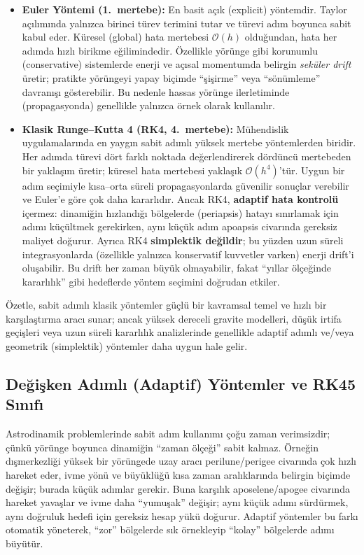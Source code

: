 \begin{itemize}
    \item \textbf{Euler Yöntemi (1.\ mertebe):}
    En basit açık (explicit) yöntemdir. Taylor açılımında yalnızca birinci türev terimini tutar ve türevi adım boyunca sabit kabul eder.
    Küresel (global) hata mertebesi $\mathcal{O}(h)$ olduğundan, hata her adımda hızlı birikme eğilimindedir.
    Özellikle yörünge gibi korunumlu (conservative) sistemlerde enerji ve açısal momentumda belirgin \emph{seküler drift} üretir;
    pratikte yörüngeyi yapay biçimde “şişirme” veya “sönümleme” davranışı gösterebilir. Bu nedenle hassas yörünge ilerletiminde
    (propagasyonda) genellikle yalnızca örnek olarak kullanılır.

    \item \textbf{Klasik Runge--Kutta 4 (RK4, 4.\ mertebe):}
    Mühendislik uygulamalarında en yaygın sabit adımlı yüksek mertebe yöntemlerden biridir. Her adımda türevi dört farklı noktada
    değerlendirerek dördüncü mertebeden bir yaklaşım üretir; küresel hata mertebesi yaklaşık $\mathcal{O}(h^{4})$’tür.
    Uygun bir adım seçimiyle kısa--orta süreli propagasyonlarda güvenilir sonuçlar verebilir ve Euler’e göre çok daha kararlıdır.
    Ancak RK4, \textbf{adaptif hata kontrolü} içermez: dinamiğin hızlandığı bölgelerde (periapsis) hatayı sınırlamak için
    adımı küçültmek gerekirken, aynı küçük adım apoapsis civarında gereksiz maliyet doğurur.
    Ayrıca RK4 \textbf{simplektik değildir}; bu yüzden uzun süreli integrasyonlarda (özellikle yalnızca konservatif kuvvetler varken)
    enerji drift’i oluşabilir. Bu drift her zaman büyük olmayabilir, fakat “yıllar ölçeğinde kararlılık” gibi hedeflerde
    yöntem seçimini doğrudan etkiler.
\end{itemize}

\noindent
Özetle, sabit adımlı klasik yöntemler güçlü bir kavramsal temel ve hızlı bir karşılaştırma aracı sunar; ancak yüksek dereceli
gravite modelleri, düşük irtifa geçişleri veya uzun süreli kararlılık analizlerinde genellikle adaptif adımlı ve/veya
geometrik (simplektik) yöntemler daha uygun hale gelir.

\subsection{Değişken Adımlı (Adaptif) Yöntemler ve RK45 Sınıfı}
Astrodinamik problemlerinde sabit adım kullanımı çoğu zaman verimsizdir; çünkü yörünge boyunca dinamiğin “zaman ölçeği”
sabit kalmaz. Örneğin dışmerkezliği yüksek bir yörüngede uzay aracı perilune/perigee civarında çok hızlı hareket eder,
ivme yönü ve büyüklüğü kısa zaman aralıklarında belirgin biçimde değişir; burada küçük adımlar gerekir. Buna karşılık
aposelene/apogee civarında hareket yavaşlar ve ivme daha “yumuşak” değişir; aynı küçük adımı sürdürmek, aynı doğruluk
hedefi için gereksiz hesap yükü doğurur. Adaptif yöntemler bu farkı otomatik yöneterek, “zor” bölgelerde sık örnekleyip
“kolay” bölgelerde adımı büyütür.

